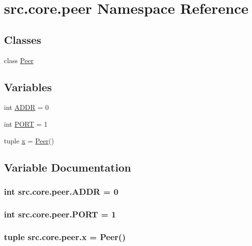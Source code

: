 \hypertarget{namespacesrc_1_1core_1_1peer}{}\section{src.\+core.\+peer Namespace Reference}
\label{namespacesrc_1_1core_1_1peer}
\subsection*{Classes}
\begin{DoxyCompactItemize}
\item 
class \hyperlink{classsrc_1_1core_1_1peer_1_1Peer}{Peer}
\end{DoxyCompactItemize}
\subsection*{Variables}
\begin{DoxyCompactItemize}
\item 
int \hyperlink{namespacesrc_1_1core_1_1peer_adf88bc9d382c736240435edbfbeb87b7}{A\+D\+D\+R} = 0
\item 
int \hyperlink{namespacesrc_1_1core_1_1peer_a2ccb4d73a714d8adf9fe1b0cf4021438}{P\+O\+R\+T} = 1
\item 
tuple \hyperlink{namespacesrc_1_1core_1_1peer_a22e00004c1a11087486ab752c3038d8b}{x} = \hyperlink{classsrc_1_1core_1_1peer_1_1Peer}{Peer}()
\end{DoxyCompactItemize}


\subsection{Variable Documentation}
\hypertarget{namespacesrc_1_1core_1_1peer_adf88bc9d382c736240435edbfbeb87b7}{}
\subsubsection[{A\+D\+D\+R}]{\setlength{\rightskip}{0pt plus 5cm}int src.\+core.\+peer.\+A\+D\+D\+R = 0}\label{namespacesrc_1_1core_1_1peer_adf88bc9d382c736240435edbfbeb87b7}
\hypertarget{namespacesrc_1_1core_1_1peer_a2ccb4d73a714d8adf9fe1b0cf4021438}{}
\subsubsection[{P\+O\+R\+T}]{\setlength{\rightskip}{0pt plus 5cm}int src.\+core.\+peer.\+P\+O\+R\+T = 1}\label{namespacesrc_1_1core_1_1peer_a2ccb4d73a714d8adf9fe1b0cf4021438}
\hypertarget{namespacesrc_1_1core_1_1peer_a22e00004c1a11087486ab752c3038d8b}{}
\subsubsection[{x}]{\setlength{\rightskip}{0pt plus 5cm}tuple src.\+core.\+peer.\+x = {\bf Peer}()}\label{namespacesrc_1_1core_1_1peer_a22e00004c1a11087486ab752c3038d8b}

